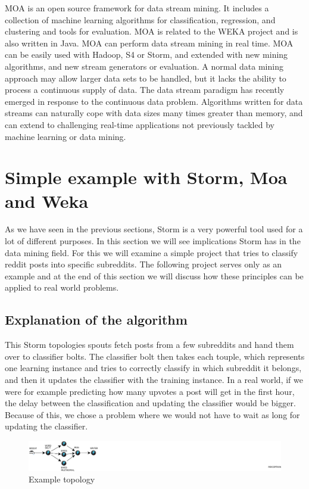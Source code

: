 \documentclass[journal]{IEEEtran/IEEEtran}
\begin{document}
MOA is an open source framework for data stream mining. It includes a collection of machine learning algorithms for classification, regression, and clustering and tools for evaluation. MOA is related to the WEKA project and is also written in Java. MOA can perform data stream mining in real time. MOA can be easily used with Hadoop, S4 or Storm, and extended with new mining algorithms, and new stream generators or evaluation. A normal data mining approach may allow larger data sets to be handled, but it lacks the ability to process a continuous supply of data. The data stream paradigm has recently emerged in response to the continuous data problem. Algorithms written for data streams can naturally cope with data sizes many times greater than memory, and can extend to challenging real-time applications not previously tackled by machine learning or data mining.

\section{Simple example with Storm, Moa and Weka}

As we have seen in the previous sections, Storm is a very powerful tool used for a lot of different purposes. In this section we will see implications Storm has in the data mining field. For this we will examine a simple project that tries to classify reddit posts into specific subreddits. The following project serves only as an example and at the end of this section we will discuss how these principles can be applied to real world problems.

\subsection{Explanation of the algorithm}

This Storm topologies spouts fetch posts from a few subreddits and hand them over to classifier bolts. The classifier bolt then takes each touple, which represents one learning instance and tries to correctly classify in which subreddit it belongs, and then it updates the classifier with the training instance. In a real world, if we were for example predicting how many upvotes a post will get in the first hour, the delay between the classification and updating the classifier would be bigger. Because of this, we chose a problem where we would not have to wait as long for updating the classifier. 

\begin{figure}[htbp]
    \begin{center}
        \includegraphics[scale=0.80]{img/shemaexample.png}
        \caption{Example topology}
        \label{res3}
    \end{center}
\end{figure}
\end{document}
